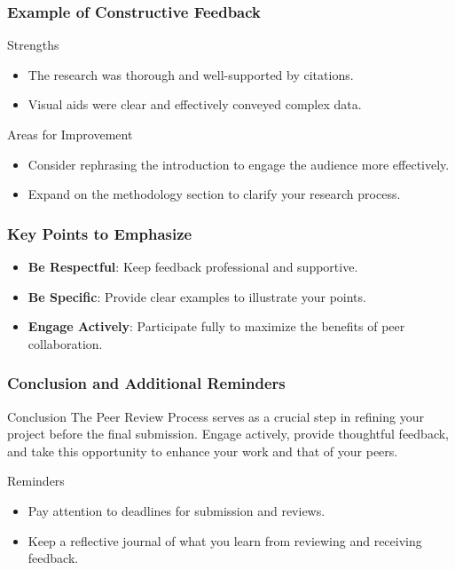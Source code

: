 \documentclass{beamer}
\begin{document}
\begin{frame}[fragile]
    \frametitle{Example of Constructive Feedback}
    \begin{block}{Strengths}
        \begin{itemize}
            \item The research was thorough and well-supported by citations.
            \item Visual aids were clear and effectively conveyed complex data.
        \end{itemize}
    \end{block}

    \begin{block}{Areas for Improvement}
        \begin{itemize}
            \item Consider rephrasing the introduction to engage the audience more effectively.
            \item Expand on the methodology section to clarify your research process.
        \end{itemize}
    \end{block}
\end{frame}

\begin{frame}[fragile]
    \frametitle{Key Points to Emphasize}
    \begin{itemize}
        \item \textbf{Be Respectful}: Keep feedback professional and supportive.
        \item \textbf{Be Specific}: Provide clear examples to illustrate your points.
        \item \textbf{Engage Actively}: Participate fully to maximize the benefits of peer collaboration.
    \end{itemize}
\end{frame}

\begin{frame}[fragile]
    \frametitle{Conclusion and Additional Reminders}
    \begin{block}{Conclusion}
        The Peer Review Process serves as a crucial step in refining your project before the final submission. Engage actively, provide thoughtful feedback, and take this opportunity to enhance your work and that of your peers.
    \end{block}
    
    \begin{block}{Reminders}
        \begin{itemize}
            \item Pay attention to deadlines for submission and reviews.
            \item Keep a reflective journal of what you learn from reviewing and receiving feedback.
        \end{itemize}
    \end{block}
\end{frame}
\end{document}
